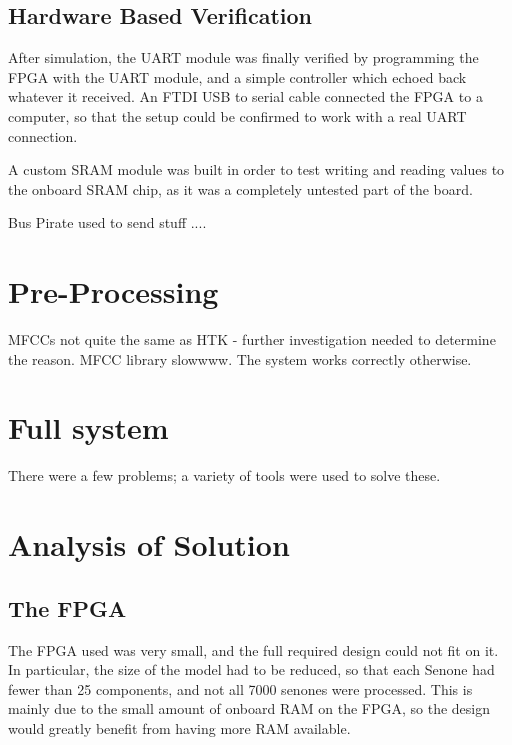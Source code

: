	\subsection{Hardware Based Verification} %
	\label{sub:hardware_based_verification}
		After simulation, the UART module was finally verified by programming the FPGA with the UART module, and a simple controller which echoed back whatever it received.  An FTDI USB to serial cable connected the FPGA to a computer, so that the setup could be confirmed to work with a real UART connection.

		A custom SRAM module was built in order to test writing and reading values to the onboard SRAM chip, as it was a completely untested part of the board.

		Bus Pirate used to send stuff ....



\section{Pre-Processing} %
\label{sec:pre_processing_testing}
	MFCCs not quite the same as HTK - further investigation needed to determine the reason.
	MFCC library slowwww.  
	The system works correctly otherwise.  


\section{Full system} %
\label{sec:full_system_testing}
	There were a few problems; a variety of tools were used to solve these.


\section{Analysis of Solution} %
\label{sec:analysis_of_solution}

	\subsection{The FPGA} %
	\label{sub:analysis_the_fpga}
		The FPGA used was very small, and the full required design could not fit on it.  In particular, the size of the model had to be reduced, so that each Senone had fewer than 25 components, and not all 7000 senones were processed.  This is mainly due to the small amount of onboard RAM on the FPGA, so the design would greatly benefit from having more RAM available.


